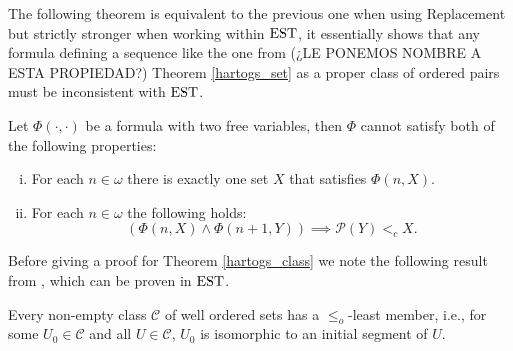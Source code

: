 The following theorem is equivalent to the previous one when using Replacement but strictly stronger when working within $\estf$, it essentially shows that any formula defining a sequence like the one from (¿LE PONEMOS NOMBRE A ESTA PROPIEDAD?) Theorem \ref{hartogs_set} as a proper class of ordered pairs must be inconsistent with $\estf$.

\begin{theorem}[$\estf$]
	\label{hartogs_class}
	Let $\Phi(\cdot,\cdot)$ be a formula with two free variables, then $\Phi$ cannot satisfy both of the following properties:
	\begin{enumerate}[(i)]
		\item \label{nat_define} For each $n\in\omega$ there is exactly one set $X$ that satisfies $\Phi(n,X)$.
		\item \label{dec_seq} For each $n\in\omega$ the following holds: 
		\[
			(\Phi(n,X) \land \Phi(n+1,Y)) \implies \mathcal{P}(Y) <_c X.
		\] 
	\end{enumerate}
\end{theorem}

Before giving a proof for Theorem \ref{hartogs_class} we note the following result from \cite[Corollary 7.33]{Moscho}, which can be proven in $\estf$.

\begin{prop}\label{class_wo}
	Every non-empty class $\mathcal{C}$ of well ordered sets has a $\leq_o$-least member, i.e., for some $U_0 \in \mathcal{C}$ and all $U\in\mathcal{C}$, $U_0$ is isomorphic to an initial segment of $U$.
\end{prop}

